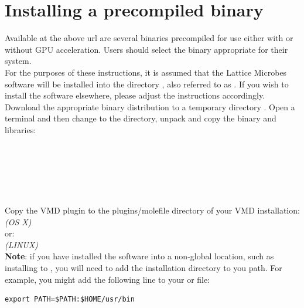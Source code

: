\section{Installing a precompiled binary} \label{sec:binInstall}

Available at the above url are several binaries precompiled for use either with or without GPU acceleration.  Users should select the binary appropriate for their system.\\

For the purposes of these instructions, it is assumed that the Lattice Microbes software will be installed into the directory , also referred to as . If you wish to install the software elsewhere, please adjust the instructions accordingly.\\

Download the appropriate binary distribution to a temporary directory . Open a terminal and then change to the directory, unpack and copy the binary and libraries: \\

\\
\\
\\
\\
\\
\\

Copy the VMD plugin to the plugins/molefile directory of your VMD
installation: \\
 \hfill {\it (OS X)}\\

or:\\
 \hfill {\it (LINUX)}\\

\textbf{Note}: if you have installed the software into a non-global location, such as installing to , you will need to add the installation directory to you path. For example, you might add the following line to your  or  file:
{\small\begin{verbatim}
export PATH=$PATH:$HOME/usr/bin
\end{verbatim}}

